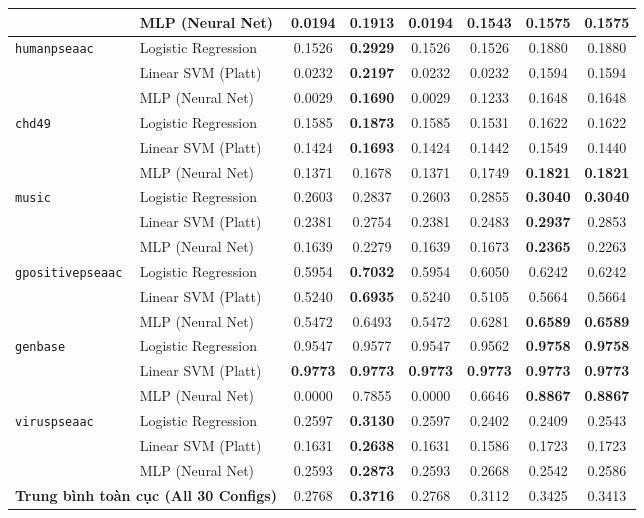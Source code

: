 \documentclass[11pt,a4paper]{article}
\begin{document}
\begin{table}[H]
{\begin{tabular}{llcccccc}
 & MLP (Neural Net) & 0.0194 & \textbf{0.1913} & 0.0194 & 0.1543 & 0.1575 & 0.1575 \\
\midrule
\multirow{3}{*}{\texttt{humanpseaac}} & Logistic Regression & 0.1526 & \textbf{0.2929} & 0.1526 & 0.1526 & 0.1880 & 0.1880 \\
 & Linear SVM (Platt) & 0.0232 & \textbf{0.2197} & 0.0232 & 0.0232 & 0.1594 & 0.1594 \\
 & MLP (Neural Net) & 0.0029 & \textbf{0.1690} & 0.0029 & 0.1233 & 0.1648 & 0.1648 \\
\midrule
\multirow{3}{*}{\texttt{chd49}} & Logistic Regression & 0.1585 & \textbf{0.1873} & 0.1585 & 0.1531 & 0.1622 & 0.1622 \\
 & Linear SVM (Platt) & 0.1424 & \textbf{0.1693} & 0.1424 & 0.1442 & 0.1549 & 0.1440 \\
 & MLP (Neural Net) & 0.1371 & 0.1678 & 0.1371 & 0.1749 & \textbf{0.1821} & \textbf{0.1821} \\
\midrule
\multirow{3}{*}{\texttt{music}} & Logistic Regression & 0.2603 & 0.2837 & 0.2603 & 0.2855 & \textbf{0.3040} & \textbf{0.3040} \\
 & Linear SVM (Platt) & 0.2381 & 0.2754 & 0.2381 & 0.2483 & \textbf{0.2937} & 0.2853 \\
 & MLP (Neural Net) & 0.1639 & 0.2279 & 0.1639 & 0.1673 & \textbf{0.2365} & 0.2263 \\
\midrule
\multirow{3}{*}{\texttt{gpositivepseaac}} & Logistic Regression & 0.5954 & \textbf{0.7032} & 0.5954 & 0.6050 & 0.6242 & 0.6242 \\
 & Linear SVM (Platt) & 0.5240 & \textbf{0.6935} & 0.5240 & 0.5105 & 0.5664 & 0.5664 \\
 & MLP (Neural Net) & 0.5472 & 0.6493 & 0.5472 & 0.6281 & \textbf{0.6589} & \textbf{0.6589} \\
\midrule
\multirow{3}{*}{\texttt{genbase}} & Logistic Regression & 0.9547 & 0.9577 & 0.9547 & 0.9562 & \textbf{0.9758} & \textbf{0.9758} \\
 & Linear SVM (Platt) & \textbf{0.9773} & \textbf{0.9773} & \textbf{0.9773} & \textbf{0.9773} & \textbf{0.9773} & \textbf{0.9773} \\
 & MLP (Neural Net) & 0.0000 & 0.7855 & 0.0000 & 0.6646 & \textbf{0.8867} & \textbf{0.8867} \\
\midrule
\multirow{3}{*}{\texttt{viruspseaac}} & Logistic Regression & 0.2597 & \textbf{0.3130} & 0.2597 & 0.2402 & 0.2409 & 0.2543 \\
 & Linear SVM (Platt) & 0.1631 & \textbf{0.2638} & 0.1631 & 0.1586 & 0.1723 & 0.1723 \\
 & MLP (Neural Net) & 0.2593 & \textbf{0.2873} & 0.2593 & 0.2668 & 0.2542 & 0.2586 \\
\midrule
\multicolumn{2}{l}{\textbf{Trung bình toàn cục (All 30 Configs)}} & 0.2768 & \textbf{0.3716} & 0.2768 & 0.3112 & 0.3425 & 0.3413 \\
\bottomrule
\end{tabular}%
}
\end{table}
\end{document}
